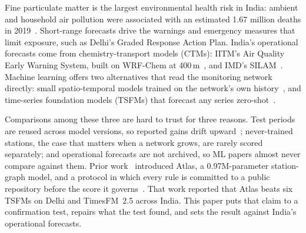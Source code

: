 \documentclass{article}
\begin{document}
Fine particulate matter is the largest environmental health risk in India: ambient and household air pollution were
associated with an estimated 1.67 million deaths in 2019~\citep{gbd2021india}. Short-range forecasts drive the warnings
and emergency measures that limit exposure, such as Delhi's Graded Response Action Plan. India's operational forecasts
come from chemistry-transport models (CTMs): IITM's Air Quality Early Warning System, built on WRF-Chem at
400\,m~\citep{grell2005wrfchem,jena2021delhi400m}, and IMD's SILAM~\citep{sofiev2015silam}. Machine learning offers two
alternatives that read the monitoring network directly: small spatio-temporal models trained on the network's own
history~\citep{zheng2015airquality,wang2020pm25gnn,liang2023airformer}, and time-series foundation models (TSFMs) that
forecast any series zero-shot~\citep{das2024timesfm,ansari2024chronos,woo2024moirai}.

Comparisons among these three are hard to trust for three reasons. Test periods are reused across model versions, so
reported gains drift upward~\citep{hewamalage2023pitfalls}; never-trained stations, the case that matters when a network
grows, are rarely scored separately; and operational forecasts are not archived, so ML papers almost never compare
against them. Prior work~\citep{atlas1} introduced Atlas, a 0.97M-parameter station-graph model, and a protocol in
which every rule is committed to a public repository before the score it governs~\citep{nosek2018prereg}. That work
reported that Atlas beats six TSFMs on Delhi and TimesFM~2.5 across India. This paper puts that claim to a confirmation
test, repairs what the test found, and sets the result against India's operational forecasts.
\end{document}
